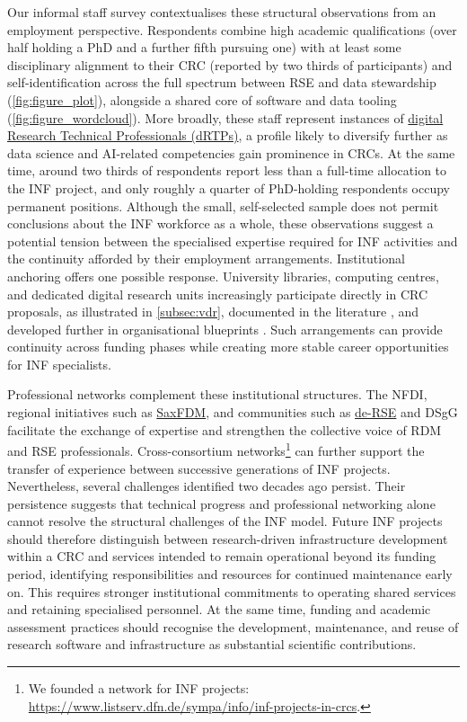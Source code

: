\documentclass{eceasst}
\begin{document}
Our informal staff survey contextualises these structural observations from an employment perspective.
Respondents combine high academic qualifications (over half holding a PhD and a further fifth pursuing one) with at least some disciplinary alignment to their CRC (reported by two thirds of participants) and self-identification across the full spectrum between RSE and data stewardship (\autoref{fig:figure_plot}), alongside a shared core of software and data tooling (\autoref{fig:figure_wordcloud}).
More broadly, these staff represent instances of \href{https://drtp-skills.ac.uk/}{digital Research Technical Professionals (dRTPs)}, a profile likely to diversify further as data science and AI-related competencies gain prominence in CRCs.
At the same time, around two thirds of respondents
report less than a full-time allocation to the
INF project, and only roughly a quarter of
PhD-holding respondents occupy permanent positions.
Although the small, self-selected sample does not
permit conclusions about the INF workforce as a whole,
these observations suggest a potential tension between
the specialised expertise required for INF activities
and the continuity afforded by their employment
arrangements.
Institutional anchoring offers one possible response.
University libraries, computing centres, and dedicated
digital research units increasingly participate directly
in CRC proposals, as illustrated in
\autoref{subsec:vdr}, documented in the literature
\cite{Hausen_Rosenberg_Trautwein-Bruns_Schwarz_2020},
and developed further in organisational blueprints
\cite{Kempf2026}.
Such arrangements can provide continuity across
funding phases while creating more stable career
opportunities for INF specialists.

Professional networks complement these institutional
structures. The NFDI, regional initiatives such as
\href{https://saxfdm.de/}{SaxFDM}, and communities
such as \href{https://de-rse.org/}{de-RSE} and DSgG
facilitate the exchange of expertise and strengthen
the collective voice of RDM and RSE professionals.
Cross-consortium networks\footnote{%
We founded a network for INF projects:
\url{https://www.listserv.dfn.de/sympa/info/inf-projects-in-crcs}.%
} can further support the transfer of experience
between successive generations of INF projects.
Nevertheless, several challenges identified two
decades ago \cite{mueckschel2006} persist.
Their persistence suggests that technical progress
and professional networking alone cannot resolve
the structural challenges of the INF model.
Future INF projects should therefore distinguish
between research-driven infrastructure development
within a CRC and services intended to remain
operational beyond its funding period, identifying
responsibilities and resources for continued
maintenance early on.
This requires stronger institutional commitments
to operating shared services and retaining
specialised personnel.
At the same time, funding and academic assessment
practices should recognise the development,
maintenance, and reuse of research software and
infrastructure as substantial scientific contributions.
\end{document}
